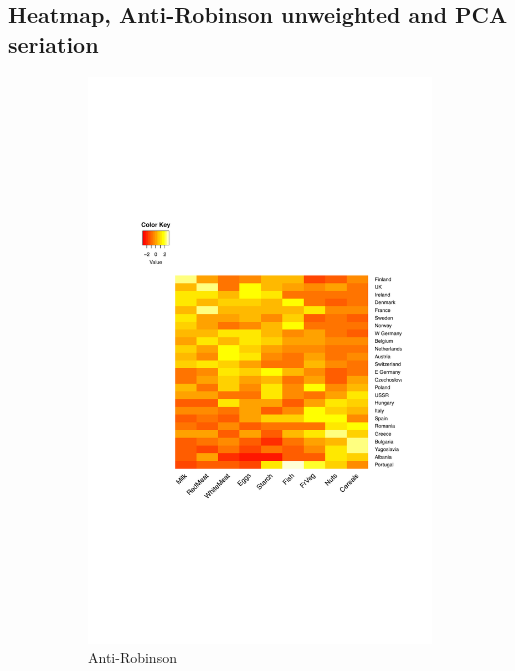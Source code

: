 \documentclass[11pt]{article}
\begin{document}

\subsection*{Heatmap, Anti-Robinson unweighted and PCA seriation}

\begin{figure}[H]
  \begin{subfigure}[h]{0.6\textwidth}
    \includegraphics[width=\textwidth]{heatmap_antirobinson.pdf}
    \caption{Anti-Robinson}
    \label{fig:heat_antirob}
  \end{subfigure}
  \begin{subfigure}[h]{0.6\textwidth}

\end{subfigure}
\end{figure}
\end{document}
